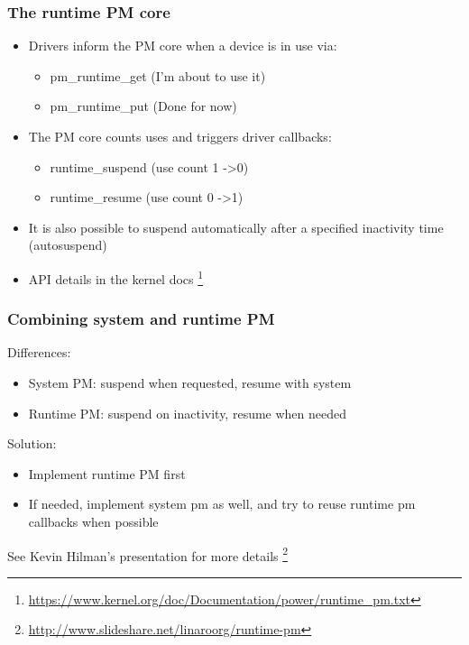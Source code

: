 \documentclass{beamer}
\begin{document}
\begin{frame}
\frametitle{The runtime PM core}
\begin{itemize}
	\item Drivers inform the PM core when a device is in use via:
	\begin{itemize}
		\item pm\_runtime\_get (I'm about to use it)
		\item pm\_runtime\_put (Done for now)
	\end{itemize}
	\item The PM core counts uses and triggers driver callbacks:
	\begin{itemize}
		\item runtime\_suspend (use count 1 -\textgreater 0)
		\item runtime\_resume (use count 0 -\textgreater 1)
	\end{itemize}
	\item It is also possible to suspend automatically after a specified inactivity time (autosuspend)
	\item API details in the kernel docs \footnote{\url{https://www.kernel.org/doc/Documentation/power/runtime\_pm.txt}}
\end{itemize}
\end{frame}

\begin{frame}
\frametitle{Combining system and runtime PM}
Differences:
\begin{itemize}
	\item System PM: suspend when requested, resume with system
	\item Runtime PM: suspend on inactivity, resume when needed
\end{itemize}
Solution:
\begin{itemize}
	\item Implement runtime PM first
	\item If needed, implement system pm as well, and try to reuse runtime pm callbacks when possible
\end{itemize} 
See Kevin Hilman's presentation for more details \footnote{\url{http://www.slideshare.net/linaroorg/runtime-pm}}
\end{frame}
\end{document}
